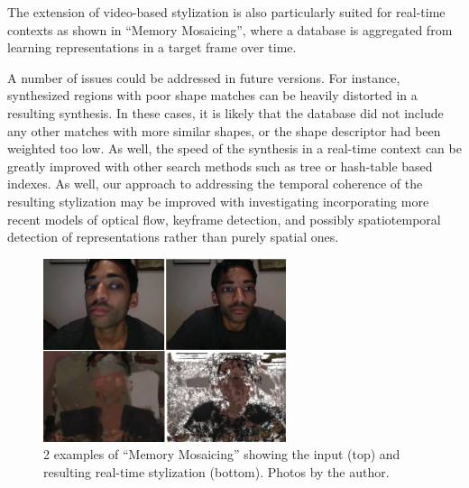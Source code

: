 \documentclass[a4paper,10pt,final]{ThesisStyle}
\begin{document}
The extension of video-based stylization is also particularly suited for real-time contexts as shown in ``Memory Mosaicing'', where a database is aggregated from learning representations in a target frame over time. 

A number of issues could be addressed in future versions.  For instance, synthesized regions with poor shape matches can be heavily distorted in a resulting synthesis.  In these cases, it is likely that the database did not include any other matches with more similar shapes, or the shape descriptor had been weighted too low.  As well, the speed of the synthesis in a real-time context can be greatly improved with other search methods such as tree or hash-table based indexes.  As well, our approach to addressing the temporal coherence of the resulting stylization may be improved with investigating incorporating more recent models of optical flow, keyframe detection, and possibly spatiotemporal detection of representations rather than purely spatial ones.   

\begin{figure}[h]
  \centering
  \includegraphics[width=2.8in]{images/memory-mosaic-2x2.png}
  \caption{2 examples of ``Memory Mosaicing'' showing the input (top) and resulting real-time stylization (bottom).   Photos by the author.}
  \label{fig:memory-mosaicing}
\end{figure}



\end{document}
